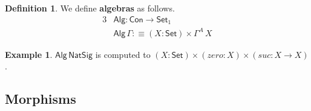 \documentclass[12pt,a4paper,twoside,openany]{book}
\theoremstyle{remark}
\theoremstyle{definition}
\newtheorem{mydefinition}{Definition}
\newtheorem{myexample}{Example}
\theoremstyle{theorem}
\newcommand{\mi}[1]{\mathit{#1}}
\newcommand{\ms}[1]{\mathsf{#1}}
\newcommand{\Con}{\mathsf{Con}}
\newcommand{\Set}{\mathsf{Set}}
\newcommand{\Alg}{\ms{Alg}}
\newcommand{\defn}{:\equiv}
\begin{document}
\begin{mydefinition} We define \textbf{algebras} as follows.
\begin{alignat*}{3}
  & \Alg : \Con \to \Set_1 \\
  & \Alg\,\Gamma \defn (X : \Set) \times \Gamma^A\,X
\end{alignat*}
\end{mydefinition}

\begin{myexample} $\Alg\,\ms{NatSig}$ is computed to $(X : \Set)\times(\mi{zero} :
X)\times(\mi{suc} : X \to X)$.
\end{myexample}

\subsection{Morphisms}
\end{document}
